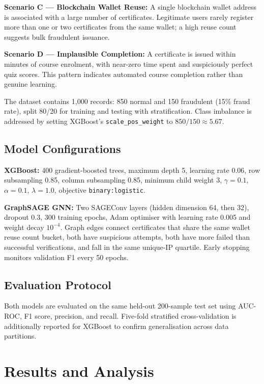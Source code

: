 \documentclass[conference]{IEEEtran}
\begin{document}
\textbf{Scenario C — Blockchain Wallet Reuse:}
A single blockchain wallet address is associated with a large number
of certificates. Legitimate users rarely register more than one or
two certificates from the same wallet; a high reuse count suggests
bulk fraudulent issuance.

\textbf{Scenario D — Implausible Completion:}
A certificate is issued within minutes of course enrolment, with
near-zero time spent and suspiciously perfect quiz scores. This
pattern indicates automated course completion rather than genuine
learning.

The dataset contains 1,000 records: 850 normal and 150 fraudulent
(15\% fraud rate), split 80/20 for training and testing with
stratification. Class imbalance is addressed by setting XGBoost's
\texttt{scale\_pos\_weight} to $850/150 \approx 5.67$.

\subsection{Model Configurations}

\textbf{XGBoost:} 400 gradient-boosted trees, maximum depth 5,
learning rate 0.06, row subsampling 0.85, column subsampling 0.85,
minimum child weight 3, $\gamma = 0.1$, $\alpha = 0.1$,
$\lambda = 1.0$, objective \texttt{binary:logistic}.

\textbf{GraphSAGE GNN:} Two SAGEConv layers (hidden dimension 64,
then 32), dropout 0.3, 300 training epochs, Adam optimiser with
learning rate 0.005 and weight decay $10^{-4}$. Graph edges connect
certificates that share the same wallet reuse count bucket, both
have suspicious attempts, both have more failed than successful
verifications, and fall in the same unique-IP quartile. Early
stopping monitors validation F1 every 50 epochs.

\subsection{Evaluation Protocol}

Both models are evaluated on the same held-out 200-sample test set
using AUC-ROC, F1 score, precision, and recall. Five-fold
stratified cross-validation is additionally reported for XGBoost
to confirm generalisation across data partitions.

\section{Results and Analysis}
\end{document}
